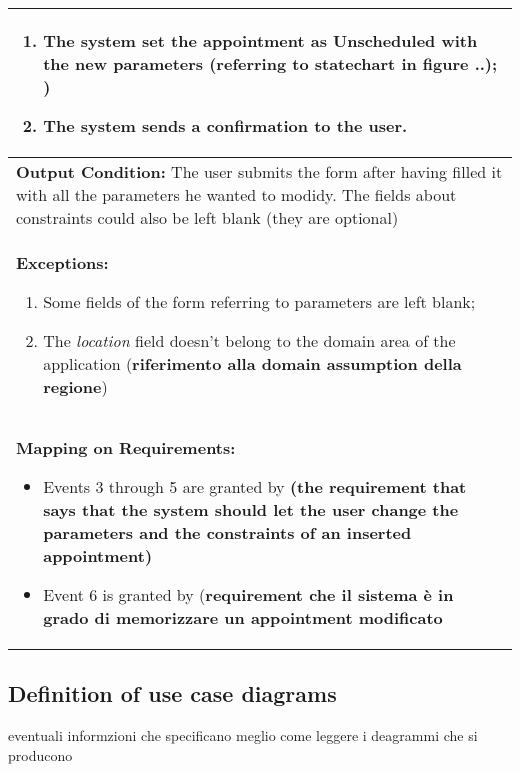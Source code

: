 \begin{longtable}{|p{14cm}|}
\begin{enumerate}
\item The system set the appointment as Unscheduled with the new parameters (referring to statechart in figure ..); \label{fig:stchartApp})
\item The system sends a confirmation to the user.
\end{enumerate}	\\ \hline
\textbf{Output Condition:} The user submits the form after having filled it with all the parameters he wanted to modidy. The fields about constraints could also be left blank (they are optional) \\ \hline
\textbf{Exceptions:}
\begin{enumerate}
\item Some fields of the form referring to parameters are left blank;
\item The \textit{location} field doesn't belong to the domain area of the application (\textbf{riferimento alla domain assumption della regione})
\end{enumerate} \\ \hline
\textbf{Mapping on Requirements:}
\begin{itemize}
\item Events 3 through 5 are granted by \textbf{(the requirement that says that the system should let the user change the parameters and the constraints of an inserted appointment)}
\item Event 6 is granted by (\textbf{requirement che il sistema è in grado di memorizzare un appointment modificato}
\end{itemize}  \\ \hline

\end{longtable}


\subsection{Definition of use case diagrams}
eventuali informzioni che specificano meglio come leggere i deagrammi che si producono


